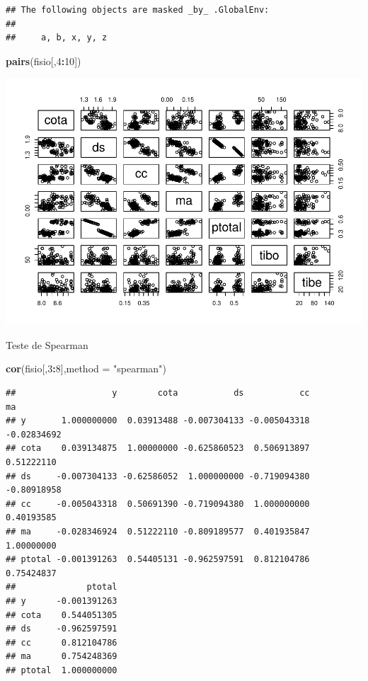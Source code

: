 \documentclass[
]{book}
\newenvironment{Shaded}{\begin{snugshade}}{\end{snugshade}}
\newcommand{\DataTypeTok}[1]{\textcolor[rgb]{0.13,0.29,0.53}{#1}}
\newcommand{\DecValTok}[1]{\textcolor[rgb]{0.00,0.00,0.81}{#1}}
\newcommand{\KeywordTok}[1]{\textcolor[rgb]{0.13,0.29,0.53}{\textbf{#1}}}
\newcommand{\NormalTok}[1]{#1}
\newcommand{\OperatorTok}[1]{\textcolor[rgb]{0.81,0.36,0.00}{\textbf{#1}}}
\newcommand{\StringTok}[1]{\textcolor[rgb]{0.31,0.60,0.02}{#1}}
\begin{document}
\begin{verbatim}
## The following objects are masked _by_ .GlobalEnv:
## 
##     a, b, x, y, z
\end{verbatim}

\begin{Shaded}
\begin{Highlighting}[]
\KeywordTok{pairs}\NormalTok{(fisio[,}\DecValTok{4}\OperatorTok{:}\DecValTok{10}\NormalTok{])}
\end{Highlighting}
\end{Shaded}

\includegraphics{TudodoR_files/figure-latex/unnamed-chunk-274-1.pdf}

Teste de Spearman

\begin{Shaded}
\begin{Highlighting}[]
\KeywordTok{cor}\NormalTok{(fisio[,}\DecValTok{3}\OperatorTok{:}\DecValTok{8}\NormalTok{],}\DataTypeTok{method =} \StringTok{"spearman"}\NormalTok{)}
\end{Highlighting}
\end{Shaded}

\begin{verbatim}
##                   y        cota           ds           cc          ma
## y       1.000000000  0.03913488 -0.007304133 -0.005043318 -0.02834692
## cota    0.039134875  1.00000000 -0.625860523  0.506913897  0.51222110
## ds     -0.007304133 -0.62586052  1.000000000 -0.719094380 -0.80918958
## cc     -0.005043318  0.50691390 -0.719094380  1.000000000  0.40193585
## ma     -0.028346924  0.51222110 -0.809189577  0.401935847  1.00000000
## ptotal -0.001391263  0.54405131 -0.962597591  0.812104786  0.75424837
##              ptotal
## y      -0.001391263
## cota    0.544051305
## ds     -0.962597591
## cc      0.812104786
## ma      0.754248369
## ptotal  1.000000000
\end{verbatim}
\end{document}
